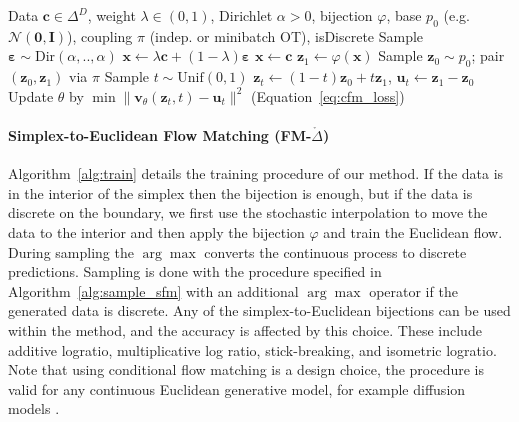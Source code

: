 \begin{algorithm}[t]
\caption{Training of Simplex-to-Euclidean Flow Matching.}
\label{alg:train}
\begin{algorithmic}[1]
\Require Data $\boldsymbol{c}\!\in\!\Delta^{D}$, weight $\lambda\!\in\!(0,1)$, 
Dirichlet $\alpha>0$, bijection $\varphi$, base $p_0$ (e.g. $\mathcal{N}(\boldsymbol{0},\boldsymbol{I})$), 
coupling $\pi$ (indep. or minibatch OT), isDiscrete
      \State Sample $\boldsymbol{\varepsilon}\!\sim\!\mathrm{Dir}(\alpha,..,\alpha)$
      \State ${\boldsymbol{x}} \gets \lambda \boldsymbol{c}+(1-\lambda)\boldsymbol{\varepsilon}$
    \Else
      \State ${\boldsymbol{x}} \gets \boldsymbol{c}$
    \EndIf
  \EndFor
  \State $\boldsymbol{z}_1 \gets \varphi({\boldsymbol{x}})$ 
  \State Sample $\boldsymbol{z}_0 \sim p_0$; pair $(\boldsymbol{z}_0,\boldsymbol{z}_1)$ via $\pi$
  \State Sample $t\sim \mathrm{Unif}(0,1)$
  \State $\boldsymbol{z}_t\!\gets\!(1-t)\boldsymbol{z}_0+t \boldsymbol{z}_1$, \;
         $\boldsymbol{u}_t\!\gets\!\boldsymbol{z}_1-\boldsymbol{z}_0$
  \State Update $\theta$ by 
  $\min \|\boldsymbol{v}_\theta(\boldsymbol{z}_t,t)-\boldsymbol{u}_t\|^2$ \; (Equation~\ref{eq:cfm_loss})
\EndFor
\end{algorithmic}
\end{algorithm}

\paragraph{Simplex-to-Euclidean Flow Matching (FM-$\mathring\Delta$)}
Algorithm~\ref{alg:train} details the training procedure of our method. If the data is in the interior of the simplex then the bijection is enough, but if the data is discrete on the boundary, we first use the stochastic interpolation to move the data to the interior and then apply the bijection $\varphi$ and train the Euclidean flow. During sampling the $\arg\max$ converts the continuous process to discrete predictions.
Sampling is done with the procedure specified in Algorithm~\ref{alg:sample_sfm} with an additional $\arg\max$ operator if the generated data is discrete. Any of the simplex-to-Euclidean bijections can be used within the method, and the accuracy is affected by this choice. These include additive logratio, multiplicative log ratio, stick-breaking, and isometric logratio.
Note that using conditional flow matching is a design choice, the procedure is valid for any continuous Euclidean generative model, for example diffusion models \citep{song2021score, Karras2024}.


